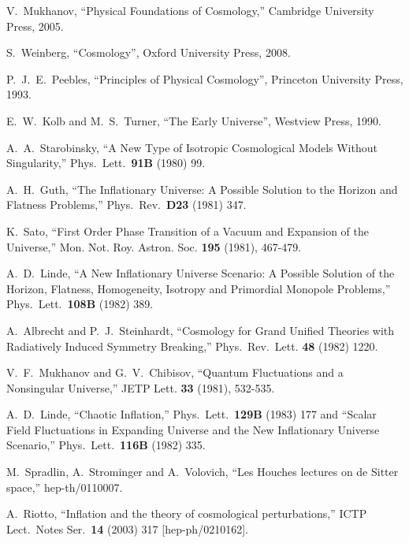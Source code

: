 \documentclass[12pt]{article}
\numberwithin{equation}{section}
\begin{document}
\begin{thebibliography}{999}
  V.~Mukhanov,
  ``Physical Foundations of Cosmology,'' Cambridge University Press, 2005.

S.~Weinberg, ``Cosmology'', Oxford University Press, 2008.

P.~J.~E.~Peebles, ``Principles of Physical Cosmology'', Princeton University Press, 1993.

E.~W.~Kolb and M.~S.~Turner, ``The Early Universe'', Westview Press, 1990.

A.~A.~Starobinsky,
``A New Type of Isotropic Cosmological Models Without Singularity,'' Phys.\ Lett.\ {\bf 91B} (1980) 99.

A.~H.~Guth,
``The Inflationary Universe: A Possible Solution to the Horizon and Flatness Problems,'' Phys.\ Rev.\ {\bf D23} (1981) 347.

K.~Sato, ``First Order Phase Transition of a Vacuum and Expansion of the Universe,''
Mon. Not. Roy. Astron. Soc. \textbf{195} (1981), 467-479.

A.~D.~Linde,
``A New Inflationary Universe Scenario: A Possible Solution of the Horizon, Flatness, Homogeneity, Isotropy and Primordial Monopole Problems,''
Phys.\ Lett.\ {\bf 108B} (1982) 389.

A.~Albrecht and P.~J.~Steinhardt,
``Cosmology for Grand Unified Theories with Radiatively Induced Symmetry Breaking,''
Phys.\ Rev.\ Lett. {\bf 48} (1982) 1220.

V.~F.~Mukhanov and G.~V.~Chibisov,
``Quantum Fluctuations and a Nonsingular Universe,''
JETP Lett. \textbf{33} (1981), 532-535.

  A.~D.~Linde,
  ``Chaotic Inflation,''
  Phys.\ Lett.\  {\bf 129B} (1983) 177
and
  ``Scalar Field Fluctuations in Expanding Universe and the New Inflationary Universe Scenario,''
  Phys.\ Lett.\  {\bf 116B} (1982) 335.

  M.~Spradlin, A.~Strominger and A.~Volovich,
  ``Les Houches lectures on de Sitter space,''
  hep-th/0110007.

  A.~Riotto,
  ``Inflation and the theory of cosmological perturbations,''
  ICTP Lect.\ Notes Ser.\  {\bf 14} (2003) 317
  [hep-ph/0210162].


\end{thebibliography}
\end{document}
